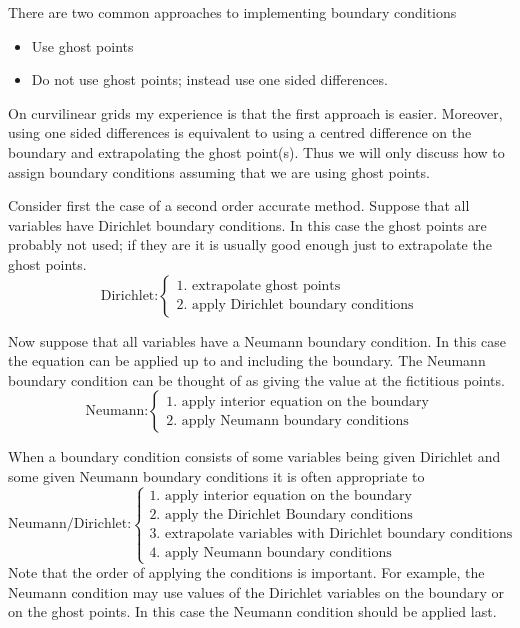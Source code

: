 There are two common approaches to implementing boundary conditions
\begin{itemize}
 \item Use ghost points
 \item Do not use ghost points; instead use one sided differences.
\end{itemize}

On curvilinear grids my experience is that the first approach 
is easier. Moreover, using one sided differences is equivalent 
to using a centred difference on the boundary and extrapolating
the ghost point(s). Thus we will only discuss how to assign 
boundary conditions assuming that we are using ghost points.

Consider first the case of a second order accurate method. 
Suppose that all variables have Dirichlet boundary conditions.
In this case the ghost points are probably not used; if they
are it is usually good enough just to extrapolate the ghost points.
\[
  \mbox{Dirichlet:} 
  \left\{ \begin{array}{l}
        \mbox{1. extrapolate ghost points} \\
        \mbox{2. apply Dirichlet boundary conditions}
          \end{array}
  \right.
\]

Now suppose that all variables have a Neumann boundary condition.
In this case the equation can be applied up to and including 
the boundary. The Neumann boundary condition can be thought of
as giving the value at the fictitious points.
\[
  \mbox{Neumann:} 
  \left\{ \begin{array}{l}
        \mbox{1. apply interior equation on the boundary} \\
        \mbox{2. apply Neumann boundary conditions}
          \end{array}
  \right.
\]


When a boundary condition consists of some variables being
given Dirichlet and some given Neumann boundary conditions
it is often appropriate to 
\[
  \mbox{Neumann/Dirichlet:} 
  \left\{ \begin{array}{l}
        \mbox{1. apply interior equation on the boundary} \\
        \mbox{2. apply the Dirichlet Boundary conditions} \\
        \mbox{3. extrapolate variables with Dirichlet boundary conditions} \\
        \mbox{4. apply Neumann boundary conditions}
          \end{array}
  \right.
\]
Note that the order of applying the conditions is important. For example,
the Neumann condition may use values of the Dirichlet variables on the
boundary or on the ghost points. In this case the Neumann condition should
be applied last.



